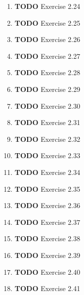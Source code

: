 \documentclass[11pt]{article}
\begin{document}
\begin{enumerate}
\begin{enumerate}
\item {\bfseries\sffamily TODO} Exercise 2.24
\label{sec:org2af5b3f}

\item {\bfseries\sffamily TODO} Exercise 2.25
\label{sec:orga31c453}

\item {\bfseries\sffamily TODO} Exercise 2.26
\label{sec:org36560c0}

\item {\bfseries\sffamily TODO} Exercise 2.27
\label{sec:org5bca5dc}

\item {\bfseries\sffamily TODO} Exercise 2.28
\label{sec:orgb984f32}

\item {\bfseries\sffamily TODO} Exercise 2.29
\label{sec:org7f7ab0b}

\item {\bfseries\sffamily TODO} Exercise 2.30
\label{sec:org4c533ec}

\item {\bfseries\sffamily TODO} Exercise 2.31
\label{sec:org4e0e6d8}

\item {\bfseries\sffamily TODO} Exercise 2.32
\label{sec:org444416d}

\item {\bfseries\sffamily TODO} Exercise 2.33
\label{sec:org3886f73}

\item {\bfseries\sffamily TODO} Exercise 2.34
\label{sec:orgac7f350}

\item {\bfseries\sffamily TODO} Exercise 2.35
\label{sec:org598d9ee}

\item {\bfseries\sffamily TODO} Exercise 2.36
\label{sec:orgfcc9153}

\item {\bfseries\sffamily TODO} Exercise 2.37
\label{sec:org6f89d24}

\item {\bfseries\sffamily TODO} Exercise 2.38
\label{sec:orgae7894e}

\item {\bfseries\sffamily TODO} Exercise 2.39
\label{sec:orged60b71}

\item {\bfseries\sffamily TODO} Exercise 2.40
\label{sec:org2c84aee}

\item {\bfseries\sffamily TODO} Exercise 2.41
\label{sec:org0289569}


\end{enumerate}
\end{enumerate}
\end{document}
